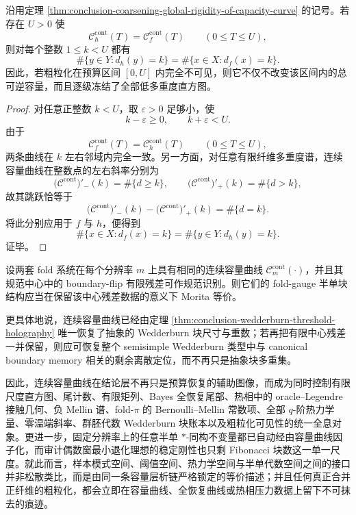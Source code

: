 \begin{corollary}[低多重度扇区的局部不可见性判据]\label{cor:conclusion-low-multiplicity-sector-local-invisibility}
沿用定理 \ref{thm:conclusion-coarsening-global-rigidity-of-capacity-curve} 的记号。若存在 \(U>0\) 使
\[
\mathcal C_h^{\mathrm{cont}}(T)=\mathcal C_f^{\mathrm{cont}}(T)
\qquad (0\le T\le U),
\]
则对每个整数 \(1\le k<U\) 都有
\[
\#\{y\in Y:d_h(y)=k\}
=
\#\{x\in X:d_f(x)=k\}.
\]
因此，若粗粒化在预算区间 \([0,U]\) 内完全不可见，则它不仅不改变该区间内的总可逆容量，而且逐级冻结了全部低多重度直方图。
\end{corollary}
\begin{proof}
对任意正整数 \(k<U\)，取 \(\varepsilon>0\) 足够小，使
\[
k-\varepsilon\ge 0,
\qquad
k+\varepsilon<U.
\]
由于
\[
\mathcal C_f^{\mathrm{cont}}(T)=\mathcal C_h^{\mathrm{cont}}(T)
\qquad (0\le T\le U),
\]
两条曲线在 \(k\) 左右邻域内完全一致。另一方面，对任意有限纤维多重度谱，连续容量曲线在整数点的左右斜率分别为
\[
\bigl(\mathcal C^{\mathrm{cont}}\bigr)'_-(k)=\#\{d\ge k\},
\qquad
\bigl(\mathcal C^{\mathrm{cont}}\bigr)'_+(k)=\#\{d>k\},
\]
故其跳跃恰等于
\[
\bigl(\mathcal C^{\mathrm{cont}}\bigr)'_-(k)-\bigl(\mathcal C^{\mathrm{cont}}\bigr)'_+(k)=\#\{d=k\}.
\]
将此分别应用于 \(f\) 与 \(h\)，便得到
\[
\#\{x\in X:d_f(x)=k\}
=
\#\{y\in Y:d_h(y)=k\}.
\]
证毕。
\end{proof}







\begin{conjecture}\label{conj:conclusion-capacity-curve-wedderburn-rigidity}
设两套 fold 系统在每个分辨率 \(m\) 上具有相同的连续容量曲线 \(\mathcal C_m^{\mathrm{cont}}(\cdot)\)，并且其规范中心中的 boundary-flip 有限残差可作规范识别。则它们的 fold-gauge 半单块结构应当在保留该中心残差数据的意义下 Morita 等价。

更具体地说，连续容量曲线已经由定理 \ref{thm:conclusion-wedderburn-threshold-holography} 唯一恢复了抽象的 Wedderburn 块尺寸与重数；若再把有限中心残差一并保留，则应可恢复整个 semisimple Wedderburn 类型中与 canonical boundary memory 相关的剩余离散定位，而不再只是抽象块多重集。
\end{conjecture}

\noindent
因此，连续容量曲线在结论层不再只是预算恢复的辅助图像，而成为同时控制有限尺度直方图、尾计数、有限矩列、Bayes 全恢复尾部、热相中的 oracle--Legendre 接触几何、负 Mellin 谱、fold-\(\pi\) 的 Bernoulli--Mellin 常数项、全部 \(q\)-阶热力学量、零温端斜率、群胚代数 Wedderburn 块账本以及粗粒化可见性的统一全息对象。更进一步，固定分辨率上的任意半单 \(\ast\)-同构不变量都已自动经由容量曲线因子化，而审计偶数窗最小退化理想的稳定刚性也只剩 Fibonacci 块数这一单一尺度。就此而言，样本模式空间、阈值空间、热力学空间与半单代数空间之间的接口并非松散类比，而是由同一条容量层析链严格锁定的等价描述；并且任何真正合并正纤维的粗粒化，都会立即在容量曲线、全恢复曲线或热相压力数据上留下不可抹去的痕迹。

\endinput
